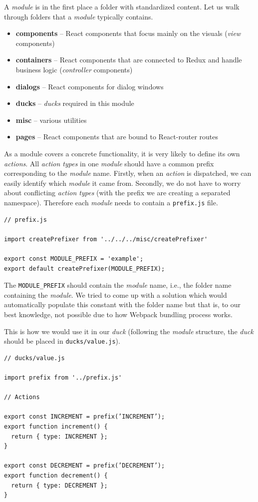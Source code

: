 A \emph{module} is in the first place a folder with standardized content. Let us walk through folders that a \emph{module} typically contains.

\begin{itemize}
\item \textbf{components} -- React components that focus mainly on the visuals (\emph{view} components)
\item \textbf{containers} -- React components that are connected to Redux and handle business logic (\emph{controller} components)
\item \textbf{dialogs} -- React components for dialog windows
\item \textbf{ducks} -- \emph{ducks} required in this module
\item \textbf{misc} -- various utilities
\item \textbf{pages} -- React components that are bound to React-router routes
\end{itemize}

As a module covers a concrete functionality, it is very likely to define its own \emph{actions}. All \emph{action types} in one \emph{module} should have a common prefix corresponding to the \emph{module} name. Firstly, when an \emph{action} is dispatched, we can easily identify which \emph{module} it came from. Secondly, we do not have to worry about conflicting \emph{action types} (with the prefix we are creating a separated namespace). Therefore each \emph{module} needs to contain a \texttt{prefix.js} file.

\begin{verbatim}
// prefix.js

import createPrefixer from '../../../misc/createPrefixer'

export const MODULE_PREFIX = 'example';
export default createPrefixer(MODULE_PREFIX);
\end{verbatim}

The \texttt{MODULE\_PREFIX} should contain the \emph{module} name, i.e., the folder name containing the \emph{module}. We tried to come up with a solution which would automatically populate this constant with the folder name but that is, to our best knowledge, not possible due to how Webpack bundling process works. 

This is how we would use it in our \emph{duck} (following the \emph{module} structure, the \emph{duck} should be placed in \texttt{ducks/value.js}).

\begin{verbatim}
// ducks/value.js

import prefix from '../prefix.js'

// Actions 

export const INCREMENT = prefix(’INCREMENT’);
export function increment() {
  return { type: INCREMENT };
}

export const DECREMENT = prefix(’DECREMENT’);
export function decrement() {
  return { type: DECREMENT };
}
\end{verbatim}

